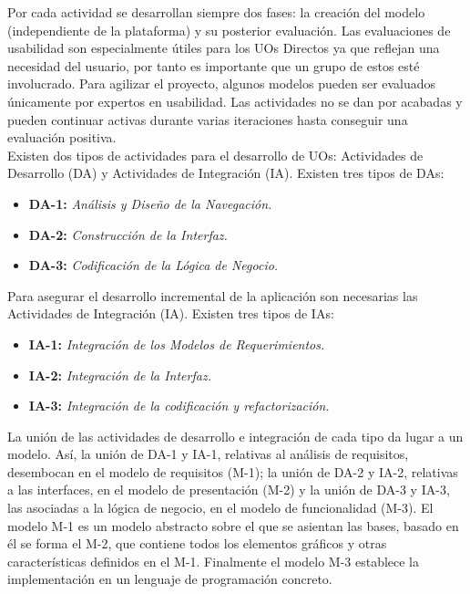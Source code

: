 Por cada actividad se desarrollan siempre dos fases: la creación del modelo (independiente de la plataforma) y su posterior evaluación. Las evaluaciones de usabilidad son especialmente útiles para los UOs Directos ya que reflejan una necesidad del usuario, por tanto es importante que un grupo de estos esté involucrado. Para agilizar el proyecto, algunos modelos pueden ser evaluados únicamente por expertos en usabilidad. Las actividades no se dan por acabadas y pueden continuar activas durante varias iteraciones hasta conseguir una evaluación positiva.\\

Existen dos tipos de actividades para el desarrollo de UOs: Actividades de Desarrollo (DA) y Actividades de Integración (IA). Existen tres tipos de DAs:

\begin{itemize}
\item \textbf{DA-1:} \textit{Análisis y Diseño de la Navegación.}
\item \textbf{DA-2:} \textit{Construcción de la Interfaz.}
\item \textbf{DA-3:} \textit{Codificación de la Lógica de Negocio.}
\end{itemize}

Para asegurar el desarrollo incremental de la aplicación son necesarias las Actividades de Integración (IA). Existen tres tipos de IAs:
\begin{itemize}
\item \textbf{IA-1:} \textit{Integración de los Modelos de Requerimientos.}
\item \textbf{IA-2:} \textit{Integración de la Interfaz.}
\item \textbf{IA-3:} \textit{Integración de la codificación y refactorización.}
\end{itemize}

La unión de las actividades de desarrollo e integración de cada tipo da lugar a un modelo. Así, la unión de DA-1 y IA-1, relativas al análisis de requisitos, desembocan en el modelo de requisitos (M-1); la unión de DA-2 y IA-2, relativas a las interfaces, en el modelo de presentación (M-2) y la unión de DA-3 y IA-3, las asociadas a la lógica de negocio, en el modelo de funcionalidad (M-3). El modelo M-1 es un modelo abstracto sobre el que se asientan las bases, basado en él se forma el M-2, que contiene todos los elementos gráficos y otras características definidos en el M-1. Finalmente el modelo M-3 establece la implementación en un lenguaje de programación concreto.\\

